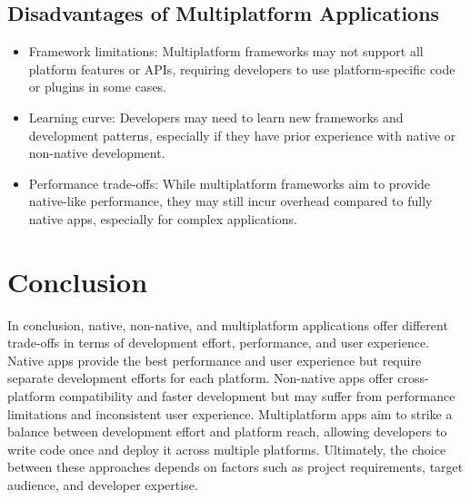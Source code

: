 \documentclass[journal,comsoc]{IEEEtran}
\begin{document}
	\subsection{Disadvantages of Multiplatform Applications}
	\begin{itemize}
		\item Framework limitations: Multiplatform frameworks may not support all platform features or APIs, requiring developers to use platform-specific code or plugins in some cases.
		\item Learning curve: Developers may need to learn new frameworks and development patterns, especially if they have prior experience with native or non-native development.
		\item Performance trade-offs: While multiplatform frameworks aim to provide native-like performance, they may still incur overhead compared to fully native apps, especially for complex applications.
	\end{itemize}
	
	\section{Conclusion}
	In conclusion, native, non-native, and multiplatform applications offer different trade-offs in terms of development effort, performance, and user experience. Native apps provide the best performance and user experience but require separate development efforts for each platform. Non-native apps offer cross-platform compatibility and faster development but may suffer from performance limitations and inconsistent user experience. Multiplatform apps aim to strike a balance between development effort and platform reach, allowing developers to write code once and deploy it across multiple platforms. Ultimately, the choice between these approaches depends on factors such as project requirements, target audience, and developer expertise.
	
	
	
	
\end{document}
